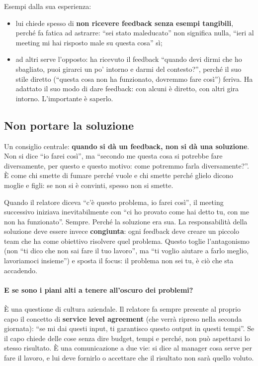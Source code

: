 Esempi dalla sua esperienza:
\begin{itemize}
  \item lui chiede spesso di \textbf{non ricevere feedback senza esempi
        tangibili}, perché fa fatica ad astrarre: ``sei stato maleducato'' non
        significa nulla, ``ieri al meeting mi hai risposto male su questa
        cosa'' sì;
  \item ad altri serve l'opposto: ha ricevuto il feedback ``quando devi dirmi
        che ho sbagliato, puoi girarci un po' intorno e darmi del contesto?'',
        perché il suo stile diretto (``questa cosa non ha funzionato, dovremmo
        fare così'') feriva. Ha adattato il suo modo di dare feedback: con
        alcuni è diretto, con altri gira intorno. L'importante è saperlo.
\end{itemize}

\subsection{Non portare la soluzione}

Un consiglio centrale: \textbf{quando si dà un feedback, non si dà una
soluzione}. Non si dice ``io farei così'', ma ``secondo me questa cosa si
potrebbe fare diversamente, per questo e questo motivo: come potremmo farla
diversamente?''. È come chi smette di fumare perché vuole e chi smette perché
glielo dicono moglie e figli: se non si è convinti, spesso non si smette.

Quando il relatore diceva ``c'è questo problema, io farei così'', il meeting
successivo iniziava inevitabilmente con ``ci ho provato come hai detto tu, con
me non ha funzionato''. Sempre. Perché la soluzione era sua. La
responsabilità della soluzione deve essere invece \textbf{congiunta}: ogni
feedback deve creare un piccolo team che ha come obiettivo risolvere quel
problema. Questo toglie l'antagonismo (non ``ti dico che non sai fare il tuo
lavoro'', ma ``ti voglio aiutare a farlo meglio, lavoriamoci insieme'') e
sposta il focus: il problema non sei tu, è ciò che sta accadendo.

\paragraph{E se sono i piani alti a tenere all'oscuro dei problemi?} È una
questione di cultura aziendale. Il relatore fa sempre presente al proprio capo
il concetto di \textbf{service level agreement} (che verrà ripreso nella
seconda giornata): ``se mi dai questi input, ti garantisco questo output in
questi tempi''. Se il capo chiede delle cose senza dire budget, tempi e
perché, non può aspettarsi lo stesso risultato. È una comunicazione a due
vie: si dice al manager cosa serve per fare il lavoro, e lui deve fornirlo o
accettare che il risultato non sarà quello voluto.

